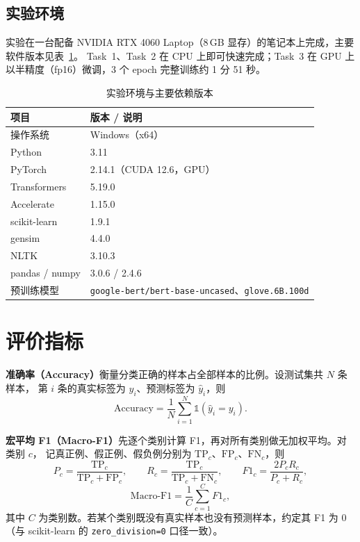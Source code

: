 \documentclass[a4paper]{article}
\begin{document}
\subsection{实验环境}
\label{sec:env}

实验在一台配备 NVIDIA RTX 4060 Laptop（8\,GB 显存）的笔记本上完成，主要软件版本见表~\ref{tab:env}。
Task~1、Task~2 在 CPU 上即可快速完成；Task~3 在 GPU 上以半精度（fp16）微调，3 个 epoch
完整训练约 1 分 51 秒。

\begin{table}[H]
  \centering
  \caption{实验环境与主要依赖版本}
  \label{tab:env}
  \begin{tabular}{l l}
    \toprule
    项目 & 版本 / 说明 \\
    \midrule
    操作系统 & Windows（x64） \\
    Python   & 3.11 \\
    PyTorch  & 2.14.1（CUDA 12.6，GPU） \\
    Transformers & 5.19.0 \\
    Accelerate   & 1.15.0 \\
    scikit-learn & 1.9.1 \\
    gensim   & 4.4.0 \\
    NLTK     & 3.10.3 \\
    pandas / numpy & 3.0.6 / 2.4.6 \\
    预训练模型 & \texttt{google-bert/bert-base-uncased}、\texttt{glove.6B.100d} \\
    \bottomrule
  \end{tabular}
\end{table}

\section{评价指标}
\label{sec:metric}

\textbf{准确率（Accuracy）}衡量分类正确的样本占全部样本的比例。设测试集共 $N$ 条样本，
第 $i$ 条的真实标签为 $y_i$、预测标签为 $\hat{y}_i$，则
\begin{equation}
  \mathrm{Accuracy} = \frac{1}{N}\sum_{i=1}^{N}\mathbb{1}\!\left(\hat{y}_i = y_i\right).
\end{equation}

\textbf{宏平均 F1（Macro-F1）}先逐个类别计算 F1，再对所有类别做无加权平均。对类别 $c$，
记真正例、假正例、假负例分别为 $\mathrm{TP}_c$、$\mathrm{FP}_c$、$\mathrm{FN}_c$，则
\begin{equation}
  P_c = \frac{\mathrm{TP}_c}{\mathrm{TP}_c+\mathrm{FP}_c}, \qquad
  R_c = \frac{\mathrm{TP}_c}{\mathrm{TP}_c+\mathrm{FN}_c}, \qquad
  F1_c = \frac{2P_cR_c}{P_c+R_c},
\end{equation}
\begin{equation}
  \mathrm{Macro\text{-}F1} = \frac{1}{C}\sum_{c=1}^{C} F1_c ,
\end{equation}
其中 $C$ 为类别数。若某个类别既没有真实样本也没有预测样本，约定其 F1 为 0
（与 scikit-learn 的 \texttt{zero\_division=0} 口径一致）。
\end{document}
